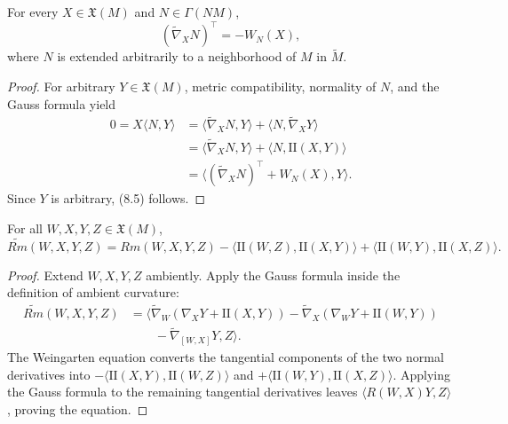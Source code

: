 \begin{proposition}
\label{prop:weingarten-equation}

For every $X\in\mathfrak X(M)$ and $N\in\Gamma(NM)$,
\begin{equation}
(\widetilde\nabla_XN)^\top=-W_N(X),
\tag{8.5}
\end{equation}
where $N$ is extended arbitrarily to a neighborhood of $M$ in
$\widetilde M$.
\end{proposition}

\begin{proof}
\sketch For arbitrary $Y\in\mathfrak X(M)$, metric compatibility, normality
of $N$, and the Gauss formula yield
\begin{align*}
0=X\langle N,Y\rangle
&=\langle\widetilde\nabla_XN,Y\rangle
 +\langle N,\widetilde\nabla_XY\rangle\\
&=\langle\widetilde\nabla_XN,Y\rangle
 +\langle N,\mathrm{II}(X,Y)\rangle\\
&=\langle(\widetilde\nabla_XN)^\top+W_N(X),Y\rangle.
\end{align*}
Since $Y$ is arbitrary, (8.5) follows.
\end{proof}

\begin{theorem}
\label{thm:gauss-equation}

For all $W,X,Y,Z\in\mathfrak X(M)$,
\[
\widetilde{Rm}(W,X,Y,Z)
=Rm(W,X,Y,Z)
-\langle\mathrm{II}(W,Z),\mathrm{II}(X,Y)\rangle
+\langle\mathrm{II}(W,Y),\mathrm{II}(X,Z)\rangle.
\]
\end{theorem}

\begin{proof}
\sketch Extend $W,X,Y,Z$ ambiently. Apply the Gauss formula inside the
definition of ambient curvature:
\begin{align*}
\widetilde{Rm}(W,X,Y,Z)
&=\big\langle
\widetilde\nabla_W(\nabla_XY+\mathrm{II}(X,Y))
-\widetilde\nabla_X(\nabla_WY+\mathrm{II}(W,Y))\\
&\qquad-\widetilde\nabla_{[W,X]}Y,Z
\big\rangle.
\end{align*}
The Weingarten equation converts the tangential components of the two normal
derivatives into
$-\langle\mathrm{II}(X,Y),\mathrm{II}(W,Z)\rangle$ and
$+\langle\mathrm{II}(W,Y),\mathrm{II}(X,Z)\rangle$. Applying the Gauss
formula to the remaining tangential derivatives leaves
$\langle R(W,X)Y,Z\rangle$, proving the equation.
\end{proof}

